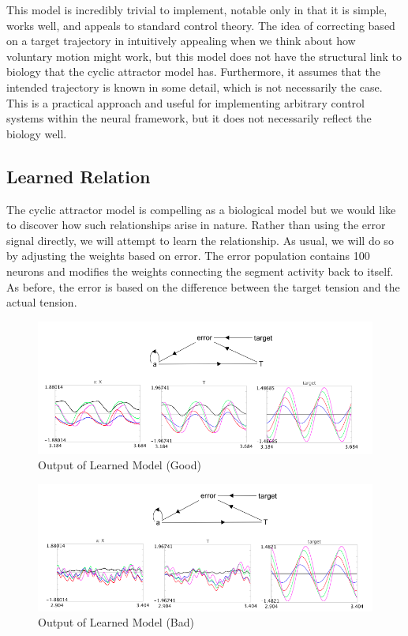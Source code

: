 \documentclass[12pt]{article}
\begin{document}
This model is incredibly trivial to implement, notable only in that it is simple, works well, and appeals to standard control theory. The idea of correcting based on a target trajectory in intuitively appealing when we think about how voluntary motion might work, but this model does not have the structural link to biology that the cyclic attractor model has. Furthermore, it assumes that the intended trajectory is known in some detail, which is not necessarily the case. This is a practical approach and useful for implementing arbitrary control systems within the neural framework, but it does not necessarily reflect the biology well.

\subsection{Learned Relation}

The cyclic attractor model is compelling as a biological model but we would like to discover how such relationships arise in nature. Rather than using the error signal directly, we will attempt to learn the relationship. As usual, we will do so by adjusting the weights based on error. The error population contains 100 neurons and modifies the weights connecting the segment activity back to itself. As before, the error is based on the difference between the target tension and the actual tension. 

    \begin{figure}[h!]
      \centering
      \includegraphics[scale=0.5]{learned.png}
      \caption{Output of Learned Model (Good)}
      \label{good}
    \end{figure}
    \begin{figure}[h!]
      \centering
      \includegraphics[scale=0.5]{fail.png}
      \caption{Output of Learned Model (Bad)}
      \label{bad}
    \end{figure}
\end{document}
